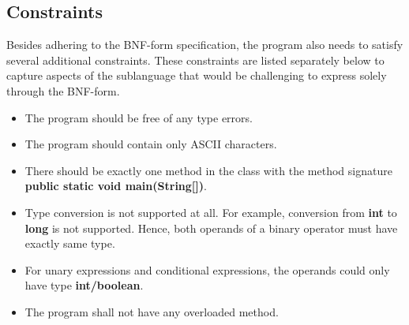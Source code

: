 \subsection*{Constraints}
Besides adhering to the BNF-form specification, the program also needs to satisfy several additional constraints. These constraints are listed separately below to capture aspects of the sublanguage that would be challenging to express solely through the BNF-form.
\begin{itemize}
    \item The program should be free of any type errors.
    \item The program should contain only ASCII characters.
    \item There should be exactly one method in the class with the method signature \textbf{public static void main(String[])}.
    \item Type conversion is not supported at all. For example, conversion from \textbf{int} to \textbf{long} is not supported. Hence, both operands of a binary operator must have exactly same type.
    \item For unary expressions and conditional expressions, the operands could only have type \textbf{int/boolean}.
    \item The program shall not have any overloaded method. 
\end{itemize}

